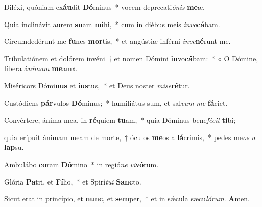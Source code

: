 \item Diléxi, quóniam ex\textbf{áu}dit \textbf{Dó}minus~* vocem deprecati\textit{ónis} \textbf{me}æ.

\item Quia inclinávit aurem \textbf{su}am \textbf{mi}hi,~* cum in diébus meis \textit{invo}\textbf{cá}bam.

\item Circumdedérunt me \textbf{fu}nes \textbf{mor}tis,~* et angústiæ inférni \textit{inve}\textbf{né}runt me.

\item Tribulatiónem et dolórem invéni~† et nomen Dómini \textbf{in}vo\textbf{cá}bam:~* « O Dómine, líbera á\textit{nimam} \textbf{me}am».

\item Miséricors Dómi\textbf{nus} et \textbf{ius}tus,~* et Deus noster \textit{mise}\textbf{ré}tur.

\item Custódiens \textbf{pár}vulos \textbf{Dó}minus;~* humiliátus sum, et sal\textit{vum} \textit{me} \textbf{fá}ciet.

\item Convértere, ánima mea, in \textbf{ré}quiem \textbf{tu}am,~* quia Dóminus bene\textit{fécit} \textbf{ti}bi;

\item quia erípuit ánimam meam de morte,~† óculos \textbf{me}os a \textbf{lá}crimis,~* pedes me\textit{os} \textit{a} \textbf{lap}su.

\item Ambulábo \textbf{co}ram \textbf{Dó}mino~* in regió\textit{ne} \textit{vi}\textbf{vó}rum.

\item Glória \textbf{Pa}tri, et \textbf{Fí}lio,~* et Spirí\textit{tui} \textbf{Sanc}to.

\item Sicut erat in princípio, et \textbf{nunc}, et \textbf{sem}per,~* et in sǽcula sæcu\textit{lórum}. \textbf{A}men.